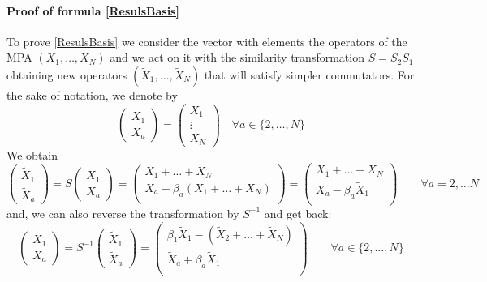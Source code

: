 \documentclass[11pt]{article}
\numberwithin{equation}{section}
\numberwithin{equation}{subsection}
\newcommand{\Xt}{\tilde{X}}
\begin{document}
\paragraph{Proof of formula \eqref{ResulsBasis}} 
To prove \eqref{ResulsBasis} we consider the vector with elements the operators of the MPA $(X_{1},\ldots,X_{N})$ and we act on it with the similarity transformation $S=S_{2}S_{1}$ obtaining new operators $(\Xt_{1},\ldots,\Xt_{N})$ that will satisfy simpler commutators. 
For the sake of notation, we denote by 
\begin{equation}
    \begin{pmatrix}
		X_{1}\\ 
		X_{a}
	\end{pmatrix}=\begin{pmatrix}
	    X_{1}\\
     \vdots\\
     X_{N}
	\end{pmatrix}\quad \forall a\in \{2,\ldots,N\}
\end{equation}
We obtain 
\begin{equation}\label{Xtildes2b}
	\begin{pmatrix}
		\Xt_{1}\\ 
		\Xt_{a}
	\end{pmatrix} =S\begin{pmatrix}
		X_{1}\\X_{a}
	\end{pmatrix}=\begin{pmatrix} 
		X_{1}+\ldots +X_{N}\\
		X_{a}-\beta_{a}(X_{1}+\ldots+X_{N})\\ 
	\end{pmatrix}=\begin{pmatrix} 
		X_{1}+\ldots +X_{N}\\
		X_{a}-\beta_{a}\Xt_{1}\\ 
	\end{pmatrix}\qquad \forall a=2,\ldots N
\end{equation}
and, we can also reverse the transformation by $S^{-1}$ and get back: 
\begin{equation}\label{Xes}
	\begin{pmatrix}
		X_{1}\\
		X_{a} 
	\end{pmatrix} =S^{-1}\begin{pmatrix}
		\widetilde{X}_{1}\\
		\widetilde{X}_{a}
	\end{pmatrix}=\begin{pmatrix}
		\beta_1\Xt_{1}-(\Xt_{2}+\ldots+\Xt_{N})\\
		\Xt_{a}+\beta_{a}\Xt_{1}\\ 
	\end{pmatrix}\qquad\forall a\in \{2,\ldots,N\}
\end{equation}
\end{document}

